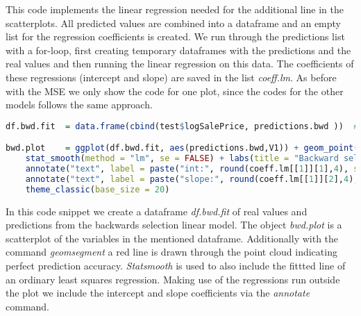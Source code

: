 This code implements the linear regression needed for the additional line in the scatterplots. All predicted values are combined into a dataframe and an empty list for the regression coefficients is created. We run through the predictions list with a for-loop, first creating temporary dataframes with the predictions and the real values and then running the linear regression on this data. The coefficients of these  regressions (intercept and slope) are saved in the list \textit{coeff.lm}. As before with the MSE we only show the code for one plot, since  the codes for the other models follows the same approach.
\begin{lstlisting}[language=R]
df.bwd.fit  = data.frame(cbind(test$logSalePrice, predictions.bwd ))  # creating dataframe containing real and predicted outcome

bwd.plot    = ggplot(df.bwd.fit, aes(predictions.bwd,V1)) + geom_point() + geom_segment(x = -4, y = -4, xend = 4, yend = 4, color = "red", size = 1.3) +
    stat_smooth(method = "lm", se = FALSE) + labs(title = "Backward selection linear model", x = "bwd.fit predictions", y = "logSalePrice") +
    annotate("text", label = paste("int:", round(coeff.lm[[1]][1],4), sep = " "), x = -2, y = 3, size =10, color = "blue") +
    annotate("text", label = paste("slope:", round(coeff.lm[[1]][2],4), sep = " "), x = -2, y = 2.5, size =10, color = "blue") + 
    theme_classic(base_size = 20) 
\end{lstlisting} 
In this code snippet we create a dataframe \textit{df.bwd.fit} of real values and predictions from the backwards selection linear model. The object \textit{bwd.plot} is a scatterplot of the variables in the mentioned dataframe. Additionally with the command \textit{geomsegment} a red line is drawn through the point cloud indicating perfect prediction accuracy. \textit{Statsmooth} is used to also include the fittted line of an ordinary least squares regression. Making use of the regressions run outside the plot we include the intercept and slope coefficients via the \textit{annotate} command.   